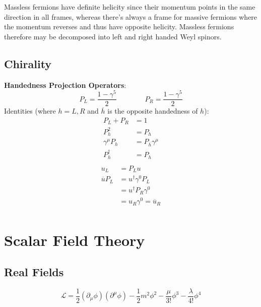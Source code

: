 \documentclass[12pt]{article}
\theoremstyle{definition}
\begin{document}
Massless fermions have definite helicity since their momentum points in the same direction in all frames,
whereas there's always a frame for massive fermions where the momentum reverses and thus have opposite helicity.
Massless fermions therefore may be decomposed into left and right handed Weyl spinors.

\subsection{Chirality}
\textbf{Handedness Projection Operators}:
\begin{equation*}
    P_L = \frac{1 - \gamma^5}{2} \qquad \qquad P_R = \frac{1 - \gamma^5}{2}
\end{equation*}
Identities (where $h = L,R$ and $\overline{h}$ is the opposite handedness of $h$):
\begin{equation*}
\begin{split}
    P_L + P_R &= 1 \\
    P_h^2 &= P_h \\
    \gamma^\mu P_h &= P_{\overline{h}} \gamma^\mu \\
    P_h^\dagger &= P_h \\
\end{split}
\end{equation*}
\begin{equation*}
\begin{split}
    u_L &= P_L u \\
    \overline{u} P_L &= u^\dagger \gamma^0 P_L \\
        &= u^\dagger P_R \gamma^0 \\
        &= u_R \gamma^0 = \overline{u}_R \\
\end{split}
\end{equation*}

\section{Scalar Field Theory}

\subsection{Real Fields}
\begin{equation*}
    \mathcal{L} = \frac{1}{2} (\partial_\mu \phi)(\partial^\mu \phi) - \frac{1}{2} m^2 \phi^2 - \frac{\mu}{3!} \phi^3 - \frac{\lambda}{4!} \phi^4
\end{equation*}
\end{document}

